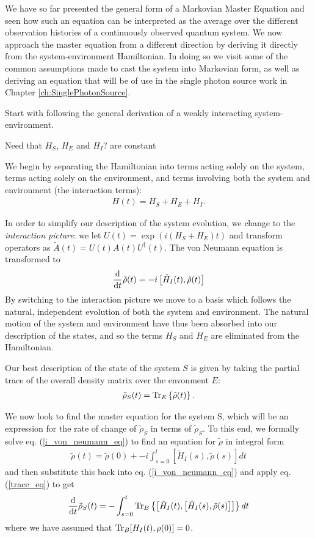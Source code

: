 We have so far presented the general form of a Markovian Master Equation and seen how such an equation can be interpreted as the average over the different observation histories of a continuously observed quantum system. We now approach the master equation from a different direction by deriving it directly from the system-environment Hamiltonian. In doing so we visit some of the common assumptions made to cast the system into Markovian form, as well as deriving an equation that will be of use in the single photon source work in Chapter \ref{ch:SinglePhotonSource}.

Start with following the general derivation of a weakly interacting system-environment.

Need that $H_S$, $H_E$ and $H_I$? are constant

We begin by separating the Hamiltonian into terms acting solely on the system, terms acting solely on the environment, and terms involving both the system and environment (the interaction terms):
\begin{align}
  H(t) = H_S + H_E + H_I.
\end{align}

In order to simplify our description of the system evolution, we change to the \textit{interaction picture}: we let $U(t) = \exp(i(H_S + H_E)t)$ and transform operators as $\tilde{A}(t) = U(t)A(t)U^\dagger(t)$. The von Neumann equation is transformed to
\begin{align}
  \label{i_von_neumann_eq}
  \frac{\mathrm{d}}{\mathrm{d}t} \tilde{\rho}(t) = -i\left[ \tilde{H}_I(t), \tilde{\rho}(t) \right]
\end{align}
By switching to the interaction picture we move to a basis which follows the natural, independent evolution of both the system and environment. The natural motion of the system and environment have thus been absorbed into our description of the states, and so the terms $H_S$ and $H_E$ are eliminated from the Hamiltonian.

Our best description of the state of the system $S$ is given by taking the partial trace of the overall density matrix over the envonment $E$:
\begin{align}
  \label{trace_eq}
  \tilde{\rho}_S(t) = \operatorname{Tr}_E\left\{\tilde{\rho}(t)\right\}.
\end{align}

We now look to find the master equation for the system S, which will be an expression for the rate of change of $\tilde{\rho}_S$ in terms of $\tilde{\rho}_S$. To this end, we formally solve eq. (\ref{i_von_neumann_eq}) to find an equation for $\tilde{\rho}$ in integral form
\begin{align}
  \tilde{\rho}(t) = \tilde{\rho}(0) + -i\int_{s=0}^t \left[ \tilde{H}_I(s), \tilde{\rho}(s) \right] dt
\end{align}
and then substitute this back into eq. (\ref{i_von_neumann_eq}) and apply eq. (\ref{trace_eq}) to get
\begin{align}
  \label{before_markov_approx}
  \frac{\mathrm{d}}{\mathrm{d}t} \tilde{\rho}_S(t) = -\int_{s=0}^t \operatorname{Tr}_B\left\{ \left[ \tilde{H}_I(t), \left[ \tilde{H}_I(s), \tilde{\rho}(s) \right] \right] \right\} dt
\end{align}
where we have assumed that $\operatorname{Tr}_B [H_I(t), \rho(0)] = 0$.


